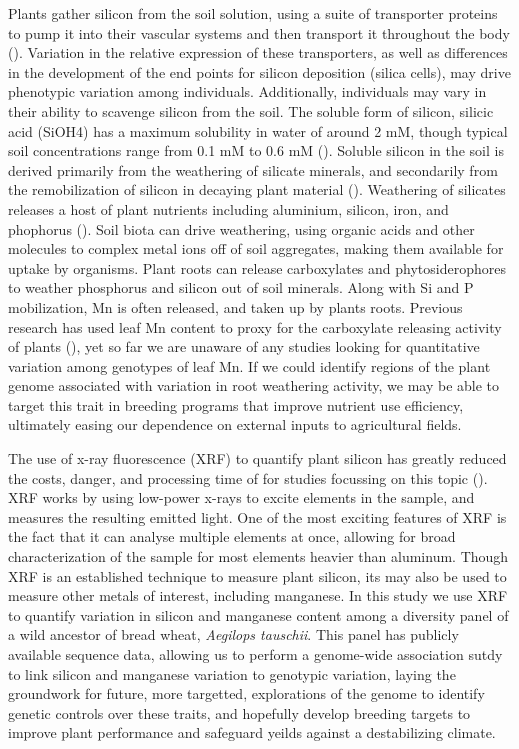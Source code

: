 \documentclass[12pt, letterpaper, ]{report}
\begin{document}
Plants gather silicon from the soil solution, using a suite of transporter proteins to pump it into their vascular systems and then transport it throughout the body (\cite{reynolds_silicon_2016}).  Variation in the relative expression of these transporters, as well as differences in the development of the end points for silicon deposition (silica cells), may drive phenotypic variation among individuals. Additionally, individuals may vary in their ability to scavenge silicon from the soil. The soluble form of silicon, silicic acid (SiOH4) has a maximum solubility in water of around 2 mM, though typical soil concentrations range from 0.1 mM to 0.6 mM (\cite{epstein_anomaly_1994}). Soluble silicon in the soil is derived primarily from the weathering of silicate minerals, and secondarily from the remobilization of silicon in decaying plant material (\cite{de_tombeur_silicon_2021-1}). Weathering of silicates releases a host of plant nutrients including aluminium, silicon, iron, and phophorus (\cite{de_tombeur_silicon_2021-1}). Soil biota can drive weathering, using organic acids and other molecules to complex metal ions off of soil aggregates, making them available for uptake by organisms. Plant roots can release carboxylates and phytosiderophores to weather phosphorus and silicon out of soil minerals. Along with Si and P mobilization, Mn is often released, and taken up by plants roots. Previous research has used leaf Mn content to proxy for the carboxylate releasing activity of plants (\cite{lambers_leaf_2015}), yet so far we are unaware of any studies looking for quantitative variation among genotypes of leaf Mn. If we could identify regions of the plant genome associated with variation in root weathering activity, we may be able to target this trait in breeding programs that improve nutrient use efficiency, ultimately easing our dependence on external inputs to agricultural fields. 

The use of x-ray fluorescence (XRF) to quantify plant silicon has greatly reduced the costs, danger, and processing time of for studies focussing on this topic (\cite{reidinger_rapid_2012}). XRF works by using low-power x-rays to excite elements in the sample, and measures the resulting emitted light. One of the most exciting features of XRF is the fact that it can analyse multiple elements at once, allowing for broad characterization of the sample for most elements heavier than aluminum. Though XRF is an established technique to measure plant silicon, its may also be used to measure other metals of interest, including manganese. In this study we use XRF to quantify variation in silicon and manganese content among a diversity panel of a wild ancestor of bread wheat, \textit{Aegilops tauschii}. This panel has publicly available sequence data, allowing us to perform a genome-wide association sutdy to link silicon and manganese variation to genotypic variation, laying the groundwork for future, more targetted, explorations of the genome to identify genetic controls over these traits, and hopefully develop breeding targets to improve plant performance and safeguard yeilds against a destabilizing climate.
\end{document}
